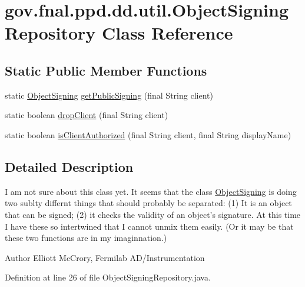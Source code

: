 \hypertarget{classgov_1_1fnal_1_1ppd_1_1dd_1_1util_1_1ObjectSigningRepository}{\section{gov.\-fnal.\-ppd.\-dd.\-util.\-Object\-Signing\-Repository Class Reference}
\label{classgov_1_1fnal_1_1ppd_1_1dd_1_1util_1_1ObjectSigningRepository}
}
\subsection*{Static Public Member Functions}
\begin{DoxyCompactItemize}
\item 
static \hyperlink{classgov_1_1fnal_1_1ppd_1_1dd_1_1util_1_1ObjectSigning}{Object\-Signing} \hyperlink{classgov_1_1fnal_1_1ppd_1_1dd_1_1util_1_1ObjectSigningRepository_a0206d457f5c293cb672b6b955887667e}{get\-Public\-Signing} (final String client)
\item 
static boolean \hyperlink{classgov_1_1fnal_1_1ppd_1_1dd_1_1util_1_1ObjectSigningRepository_a3f82ee3ffd872658ae83e4e082d1b1a5}{drop\-Client} (final String client)
\item 
static boolean \hyperlink{classgov_1_1fnal_1_1ppd_1_1dd_1_1util_1_1ObjectSigningRepository_a92b52ed0e207527af50af4877afff94c}{is\-Client\-Authorized} (final String client, final String display\-Name)
\end{DoxyCompactItemize}


\subsection{Detailed Description}
I am not sure about this class yet. It seems that the class \hyperlink{classgov_1_1fnal_1_1ppd_1_1dd_1_1util_1_1ObjectSigning}{Object\-Signing} is doing two sublty differnt things that should probably be separated\-: (1) It is an object that can be signed; (2) it checks the validity of an object's signature. At this time I have these so intertwined that I cannot unmix them easily. (Or it may be that these two functions are in my imaginnation.)

\begin{DoxyAuthor}{Author}
Elliott Mc\-Crory, Fermilab A\-D/\-Instrumentation 
\end{DoxyAuthor}


Definition at line 26 of file Object\-Signing\-Repository.\-java.



